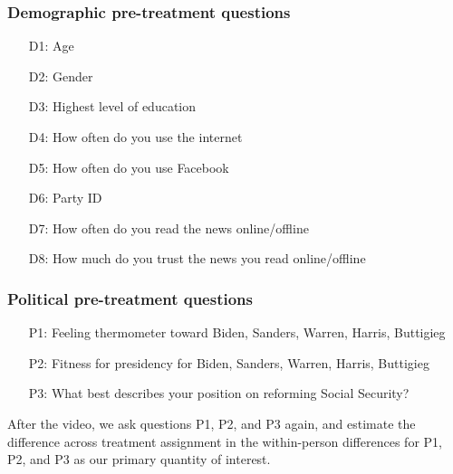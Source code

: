 \subsubsection{Demographic pre-treatment questions}
{  
  \begin{itemize}
  \item[D1:] Age
  \item[D2:] Gender
  \item[D3:] Highest level of education
  \item[D4:] How often do you use the internet
  \item[D5:] How often do you use Facebook
  \item[D6:] Party ID
  \item[D7:] How often do you read the news online/offline
  \item[D8:] How much do you trust the news you read online/offline
  \end{itemize}
}

\subsubsection{Political pre-treatment questions}
{  
  \begin{itemize}
  \item[P1:] Feeling thermometer toward Biden, Sanders, Warren, Harris, Buttigieg
  \item[P2:] Fitness for presidency for Biden, Sanders, Warren, Harris, Buttigieg
  \item[P3:] What best describes your position on reforming Social Security?
  \end{itemize}
}

After the video, we ask questions P1, P2, and P3 again, and estimate
the difference across treatment assignment in the within-person
differences for P1, P2, and P3 as our primary quantity of interest.
